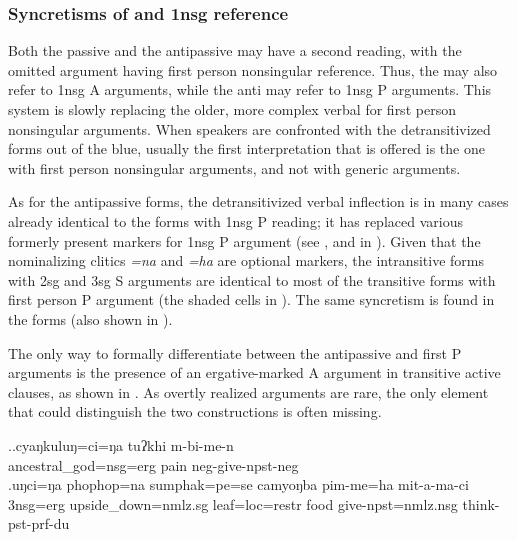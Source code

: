 \subsubsection{Syncretisms of  and {\sc 1nsg} re\-fe\-rence}\label{detrans-polite}

Both the passive and the antipassive may have a second reading, with the omitted argument having first person nonsingular reference. Thus, the  may also refer to 1{\sc nsg} A arguments, while the anti may refer to 1{\sc nsg}  P arguments. This system is slowly replacing the older, more complex verbal  for first person nonsingular arguments. When speakers are confronted with the detransitivized forms out of the blue, usually the first interpretation that is offered is the one with first person nonsingular arguments, and not with generic arguments. 

As for the antipassive forms, the detransitivized verbal inflection is in many cases already identical to the forms with 1{\sc nsg}  P reading; it has replaced various formerly present markers for 1{\sc nsg}  P argument (see , and  in ).
Given that the nominalizing clitics \emph{=na} and \emph{=ha} are optional markers, the intransitive forms with 2sg and 3sg S arguments are identical to most of the transitive forms with first person P argument (the shaded cells in ). The same syncretism is found in the  forms (also shown in ).


The only way to formally differentiate between the antipassive and first  P arguments is the presence of an ergative-marked A argument in transitive active clauses, as shown in \Next. As overtly realized arguments are rare, the only  element that could distinguish the two constructions is often missing.  

\ex.\ag.cyaŋkuluŋ=ci=ŋa     tuʔkhi m-bi-me-n\\
ancestral\_god{\sc =nsg=erg} pain {\sc neg-}give{\sc [3A;1.P]-npst-neg}\\
\bg.uŋci=ŋa   phophop=na  sumphak=pe=se   camyoŋba pim-me=ha mit-a-ma-ci\\
{\sc 3nsg=erg} upside\_down{\sc =nmlz.sg} leaf{\sc =loc=restr} food  give{\sc [3A;1.P]-npst=nmlz.nsg} think{\sc -pst-prf-du}\\


